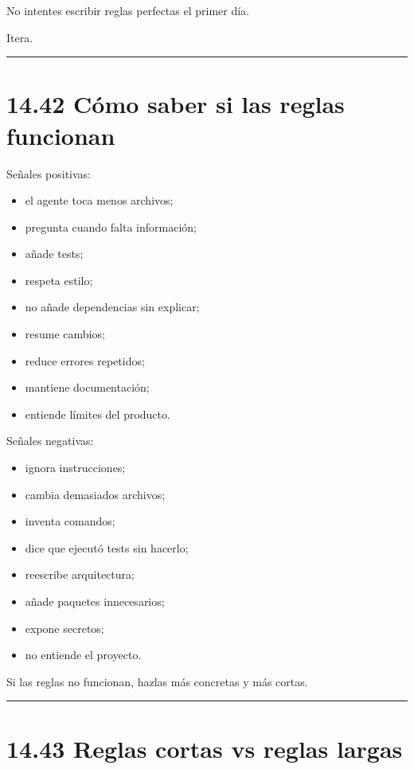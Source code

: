 No intentes escribir reglas perfectas el primer día.

Itera.

\begin{center}\rule{0.5\linewidth}{0.5pt}\end{center}

\section{14.42 Cómo saber si las reglas
funcionan}\label{cuxf3mo-saber-si-las-reglas-funcionan}

Señales positivas:

\begin{itemize}
\tightlist
\item
  el agente toca menos archivos;
\item
  pregunta cuando falta información;
\item
  añade tests;
\item
  respeta estilo;
\item
  no añade dependencias sin explicar;
\item
  resume cambios;
\item
  reduce errores repetidos;
\item
  mantiene documentación;
\item
  entiende límites del producto.
\end{itemize}

Señales negativas:

\begin{itemize}
\tightlist
\item
  ignora instrucciones;
\item
  cambia demasiados archivos;
\item
  inventa comandos;
\item
  dice que ejecutó tests sin hacerlo;
\item
  reescribe arquitectura;
\item
  añade paquetes innecesarios;
\item
  expone secretos;
\item
  no entiende el proyecto.
\end{itemize}

Si las reglas no funcionan, hazlas más concretas y más cortas.

\begin{center}\rule{0.5\linewidth}{0.5pt}\end{center}

\section{14.43 Reglas cortas vs reglas
largas}\label{reglas-cortas-vs-reglas-largas}

